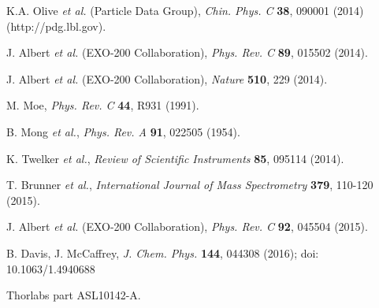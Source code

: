 \documentclass[aps,pra,reprint,superscriptaddress]{revtex4-1}
\begin{document}
%
\begin{thebibliography}{00}
  K.A. Olive \emph{et al.} (Particle Data Group), \emph{Chin. Phys. C} \textbf{38}, 090001 (2014) (http://pdg.lbl.gov).


 J. Albert \emph{et al.} (EXO-200 Collaboration), \emph{Phys. Rev. C} \textbf{89}, 015502 (2014).

 J. Albert \emph{et al.} (EXO-200 Collaboration), \emph{Nature} \textbf{510}, 229 (2014).

 M. Moe, \emph{Phys. Rev. C} \textbf{44}, R931 (1991).

 B. Mong \emph{ et al.}, \emph{Phys. Rev. A} \textbf{91}, 022505 (1954).

 K. Twelker \emph{ et al.}, \emph{Review of Scientific Instruments} \textbf{85}, 095114 (2014).

 T. Brunner \emph{ et al.}, \emph{International Journal of Mass Spectrometry} \textbf{379}, 110-120 (2015).

 J. Albert \emph{et al.} (EXO-200 Collaboration), \emph{Phys. Rev. C} \textbf{92}, 045504 (2015).

 B. Davis, J. McCaffrey, \emph{J. Chem. Phys.} \textbf{144}, 044308 (2016); doi: 10.1063/1.4940688

 Thorlabs part ASL10142-A.
\end{thebibliography}
\end{document}
